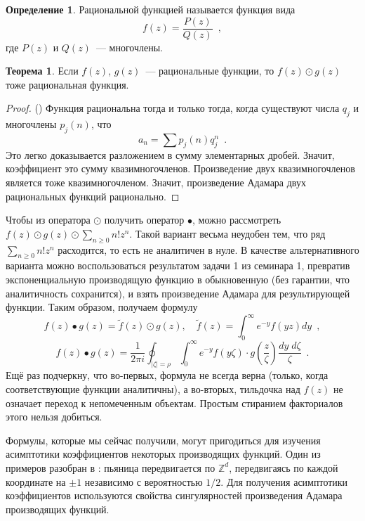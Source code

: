 \documentclass[a5paper]{article}
\theoremstyle{definition}
\newtheorem*{theorem}{Теорема}
\newtheorem*{definition}{Определение}
\begin{document}
\begin{definition}
Рациональной функцией называется функция вида
\[
    f(z) = \dfrac{P(z)}{Q(z)} \enspace ,
\] 
где \( P(z) \) и \( Q(z) \)~--- многочлены. 
\end{definition}
\begin{theorem}
Если \( f(z) \), \( g(z) \)~---
рациональные функции, то \( f(z) \odot g(z) \) тоже рациональная функция.
\end{theorem}
\begin{proof}({\cite{lando}})
	Функция рациональна тогда и только тогда, когда существуют числа \( q_j \) и 
	многочлены \( p_j(n) \), что
	\[
		a_n = \sum p_j(n)q_j^n \enspace .
	\]
    Это легко доказывается разложением в сумму элементарных дробей. Значит,
коэффициент это сумму квазимногочленов.
	Произведение двух квазимногочленов является тоже квазимногочленом. Значит,
произведение Адамара двух рациональных функций рационально.
\end{proof}

Чтобы из оператора \( \odot \) получить оператор \( \bullet \), можно
рассмотреть \( f(z) \odot g(z) \odot \sum_{n \geq 0} n! z^n \). Такой вариант
весьма неудобен тем, что ряд \( \sum_{n \geq 0} n! z^n \) расходится, то есть не
аналитичен в нуле. В качестве альтернативного варианта можно воспользоваться
результатом задачи 1 из семинара 1, превратив экспоненциальную производящую
функцию в обыкновенную (без гарантии, что аналитичность сохранится), и взять
произведение Адамара для результирующей функции. Таким образом, получаем формулу
\[
    f(z) \bullet g(z) = \widetilde f(z) \odot g(z), \quad
    \widetilde f(z) = \int_{0}^\infty e^{-y} f(yz) dy \enspace ,
\]
\[
    f(z) \bullet g(z) = \dfrac{1}{2\pi i} \oint_{|\zeta| = \rho}
    \int_{0}^\infty e^{-y} f(y \zeta) \cdot g \left(\dfrac{z}{\zeta} \right)
\dfrac{dy\; d \zeta}{\zeta}
\enspace .
\]
Ещё раз подчеркну, что во-первых, формула не всегда верна (только, когда
соответствующие функции аналитичны), а во-вторых, тильдочка над \( f(z) \) не
означает переход к непомеченным объектам. Простым стиранием факториалов этого
нельзя добиться.

Формулы, которые мы сейчас получили, могут пригодиться для изучения асимптотики
коэффициентов некоторых производящих функций. Один из примеров разобран в
\cite[Example VI.14, page 425]{AC}: пьяница передвигается по \( \mathbb Z^d \),
передвигаясь по каждой координате на \( \pm 1 \) независимо с вероятностью \(
1/2 \). Для получения асимптотики коэффициентов используются свойства
сингулярностей произведения Адамара производящих функций.
\end{document}

